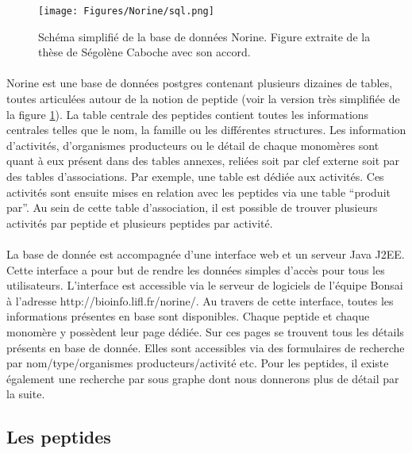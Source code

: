 \documentclass[12pt,french,twoside]{report}
\begin{document}
\begin{figure}[h!]
  \begin{center}
    \texttt{[image: Figures/Norine/sql.png]}
    \caption{\label{sql}Schéma simplifié de la base de données Norine.
    Figure extraite de la thèse de Ségolène Caboche avec son accord.}
  \end{center}
\end{figure}

\paragraph{}Norine est une base de données postgres contenant plusieurs dizaines de tables, toutes articulées autour de la notion de peptide (voir la version très simplifiée de la figure \ref{sql}).
La table centrale des peptides contient toutes les informations centrales telles que le nom, la famille ou les différentes structures.
Les information d'activités, d'organismes producteurs ou le détail de chaque monomères sont quant à eux présent dans des tables annexes, reliées soit par clef externe soit par des tables d'associations.
Par exemple, une table est dédiée aux activités.
Ces activités sont ensuite mises en relation avec les peptides via une table ``produit par''.
Au sein de cette table d'association, il est possible de trouver plusieurs activités par peptide et plusieurs peptides par activité.

\paragraph{}La base de donnée est accompagnée d'une interface web et un serveur Java J2EE.
Cette interface a pour but de rendre les données simples d'accès pour tous les utilisateurs.
L'interface est accessible via le serveur de logiciels de l'équipe Bonsai à l'adresse http://bioinfo.lifl.fr/norine/.
Au travers de cette interface, toutes les informations présentes en base sont disponibles.
Chaque peptide et chaque monomère y possèdent leur page dédiée.
Sur ces pages se trouvent tous les détails présents en base de donnée.
Elles sont accessibles via des formulaires de recherche par nom/type/organismes producteurs/activité etc.
Pour les peptides, il existe également une recherche par sous graphe dont nous donnerons plus de détail par la suite.



\subsection{Les peptides}
\end{document}
